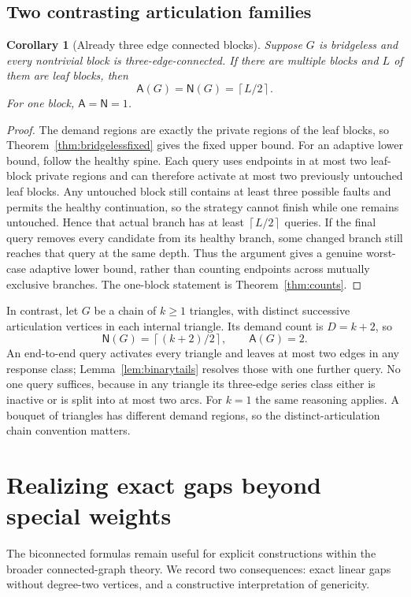 \documentclass[11pt,letterpaper]{article}
\newtheorem{corollary}[theorem]{Corollary}
\newcommand{\ceil}[1]{\left\lceil #1\right\rceil}
\newcommand{\A}{\mathsf A}
\newcommand{\N}{\mathsf N}
\begin{document}
\subsection{Two contrasting articulation families}
\begin{corollary}[Already three edge connected blocks]\label{cor:leafblocks}
Suppose $G$ is bridgeless and every nontrivial block is three-edge-connected. If there are multiple blocks and $L$ of them are leaf blocks, then
\[
 \A(G)=\N(G)=\ceil{L/2}.
\]
For one block, $\A=\N=1$.
\end{corollary}
\begin{proof}
The demand regions are exactly the private regions of the leaf blocks, so Theorem~\ref{thm:bridgelessfixed} gives the fixed upper bound. For an adaptive lower bound, follow the healthy spine. Each query uses endpoints in at most two leaf-block private regions and can therefore activate at most two previously untouched leaf blocks. Any untouched block still contains at least three possible faults and permits the healthy continuation, so the strategy cannot finish while one remains untouched. Hence that actual branch has at least $\ceil{L/2}$ queries. If the final query removes every candidate from its healthy branch, some changed branch still reaches that query at the same depth. Thus the argument gives a genuine worst-case adaptive lower bound, rather than counting endpoints across mutually exclusive branches. The one-block statement is Theorem~\ref{thm:counts}.
\end{proof}

In contrast, let $G$ be a chain of $k\ge1$ triangles, with distinct successive articulation vertices in each internal triangle. Its demand count is $D=k+2$, so
\[
 \N(G)=\ceil{(k+2)/2},\qquad \A(G)=2.
\]
An end-to-end query activates every triangle and leaves at most two edges in any response class; Lemma~\ref{lem:binarytails} resolves those with one further query. No one query suffices, because in any triangle its three-edge series class either is inactive or is split into at most two arcs. For $k=1$ the same reasoning applies. A bouquet of triangles has different demand regions, so the distinct-articulation chain convention matters.

\section{Realizing exact gaps beyond special weights}\label{sec:realization}
The biconnected formulas remain useful for explicit constructions within the broader connected-graph theory. We record two consequences: exact linear gaps without degree-two vertices, and a constructive interpretation of genericity.
\end{document}
